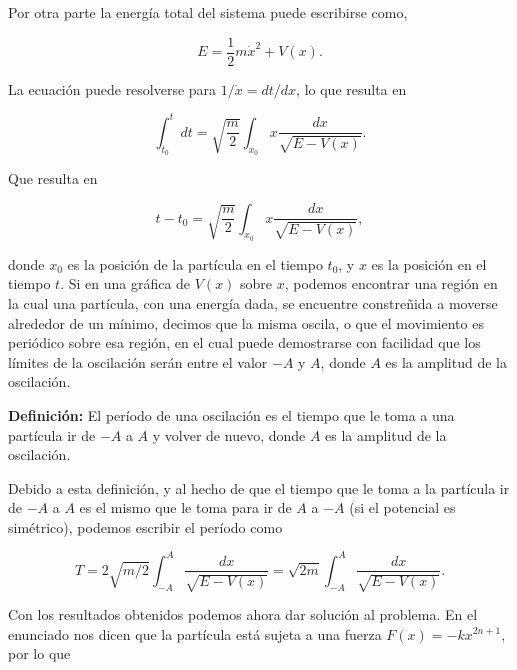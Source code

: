\documentclass[a4paper,10pt]{article}
\numberwithin{equation}{section}
\newcommand{\definicion}{\textbf{Definición: }}
\begin{document}
Por otra parte la energía total del sistema puede escribirse como,

\begin{equation}
 E = \frac{1}{2} m\dot{x}^2 + V(x).
 \label{eq:energTotal1}
\end{equation}

La ecuación  puede resolverse para $1/\dot{x}=dt/dx$, lo que 
resulta en 

\begin{equation}
 \int_{t_0}^t dt = \sqrt{\frac{m}{2}} \int_{x_0}^{}x \frac{dx}{\sqrt{E - V(x)}}.
\end{equation}

Que resulta en 

\begin{equation}
  t - t_0 = \sqrt{\frac{m}{2}} \int_{x_0}^{}x \frac{dx}{\sqrt{E - V(x)}},
\end{equation}

donde $x_0$ es la posición de la partícula en el tiempo $t_0$, y $x$ es la posición 
en el tiempo $t$. Si en una gráfica de $V(x)$ sobre $x$, podemos encontrar una 
región en la cual una partícula, con una energía dada, se encuentre constreñida 
a moverse alrededor de un mínimo, decimos que la misma oscila, o que el movimiento 
es periódico sobre esa región, en el cual puede demostrarse con facilidad que 
los límites de la oscilación serán entre el valor $-A$ y $A$, donde $A$ es la amplitud 
de la oscilación.

\vspace{.3cm}

\definicion El período de una oscilación es el tiempo que le toma a una partícula 
ir de $-A$ a $A$ y volver de nuevo, donde $A$ es la amplitud de la oscilación.

\vspace{.3cm}

Debido a esta definición, y al hecho de que el tiempo que le toma a la partícula ir 
de $-A$ a $A$ es el mismo que le toma para ir de $A$ a $-A$ (si el potencial 
es simétrico), podemos escribir el período como

\begin{equation}
 T = 2 \sqrt{m/2} \int_{-A}^A \frac{dx}{\sqrt{E - V(x)}} = \sqrt{2m} \int_{-A}^A \frac{dx}{\sqrt{E - V(x)}}.
\label{eq:periodo1}
\end{equation}


Con los resultados obtenidos podemos ahora dar solución al problema. En el 
enunciado nos dicen que la partícula está sujeta a una fuerza $F(x) = - kx^{2n+1}$,
por lo que 
\end{document}
